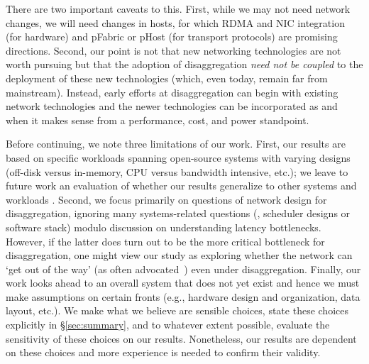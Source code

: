 There are two important caveats to this.  First, while we may not need network changes, we will need changes in hosts, for which RDMA and NIC integration (for hardware) and pFabric or pHost (for transport protocols) are promising directions. Second, our point is not that new networking technologies are not worth pursuing but that the adoption of disaggregation \emph{need not be coupled} to the deployment of these new technologies (which, even today, remain far from mainstream). Instead, early efforts at disaggregation can begin with existing network technologies and the newer technologies can be incorporated as and when it makes sense from a performance, cost, and power standpoint.

Before continuing, we note three limitations of our work. First, our results are based on  specific workloads spanning  open-source systems with varying designs (off-disk versus in-memory, CPU versus bandwidth intensive, etc.); we leave to future work an evaluation of whether our results generalize to other systems and workloads . Second, we focus primarily on questions of network design for disaggregation, ignoring many systems-related questions (\eg, scheduler designs or software stack) modulo discussion on understanding latency bottlenecks. However, if the latter does turn out to be the more critical bottleneck for disaggregation, one might view our study as exploring whether the network can `get out of the way' (as often advocated~\cite{greenberg-sigcomm15}) even under disaggregation. Finally, our work looks ahead to an overall system that does not yet exist and hence we must make assumptions on certain fronts (e.g., hardware design and organization, data layout, etc.). We make what we believe are sensible choices, state these choices explicitly in \S\ref{sec:summary}, and to whatever extent possible, evaluate the sensitivity of these choices on our results. Nonetheless, our results are dependent on these choices and more experience is needed to confirm their validity.

